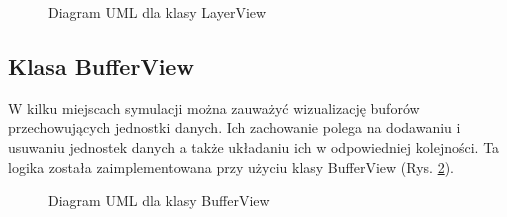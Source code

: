 \begin{figure}[ht]
	\centerline{}
	\caption{Diagram UML dla klasy LayerView}
	\label{fig:layer_view_class}
\end{figure}

\subsection{Klasa BufferView}

W kilku miejscach symulacji można zauważyć wizualizację buforów przechowujących jednostki danych. Ich zachowanie polega na dodawaniu i usuwaniu jednostek danych a także układaniu ich w odpowiedniej kolejności. Ta logika została zaimplementowana przy użyciu klasy BufferView (Rys. \ref{fig:buffer_view_class}).

\begin{figure}[ht]
	\centerline{}
	\caption{Diagram UML dla klasy BufferView}
	\label{fig:buffer_view_class}
\end{figure}
